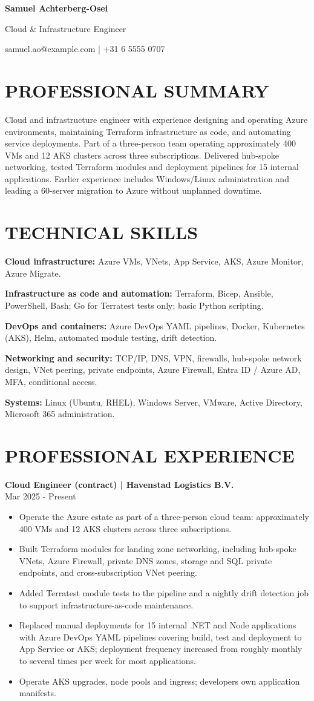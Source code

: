 \documentclass[11pt,a4paper]{article}
\newcommand{\cvsection}[1]{\section*{#1}}
\newcommand{\cvrole}[2]{\par\addvspace{0.5em}\noindent\textbf{#1}\\#2\par}
\begin{document}
{\Huge\bfseries\color{primarycolor} Samuel Achterberg-Osei}\par
{\large\color{accentcolor} Cloud \& Infrastructure Engineer}\par
samuel.ao@example.com | +31 6 5555 0707

\cvsection{PROFESSIONAL SUMMARY}
Cloud and infrastructure engineer with experience designing and operating Azure environments, maintaining Terraform infrastructure as code, and automating service deployments. Part of a three-person team operating approximately 400 VMs and 12 AKS clusters across three subscriptions. Delivered hub-spoke networking, tested Terraform modules and deployment pipelines for 15 internal applications. Earlier experience includes Windows/Linux administration and leading a 60-server migration to Azure without unplanned downtime.

\cvsection{TECHNICAL SKILLS}
\textbf{Cloud infrastructure:} Azure VMs, VNets, App Service, AKS, Azure Monitor, Azure Migrate.\par
\textbf{Infrastructure as code and automation:} Terraform, Bicep, Ansible, PowerShell, Bash; Go for Terratest tests only; basic Python scripting.\par
\textbf{DevOps and containers:} Azure DevOps YAML pipelines, Docker, Kubernetes (AKS), Helm, automated module testing, drift detection.\par
\textbf{Networking and security:} TCP/IP, DNS, VPN, firewalls, hub-spoke network design, VNet peering, private endpoints, Azure Firewall, Entra ID / Azure AD, MFA, conditional access.\par
\textbf{Systems:} Linux (Ubuntu, RHEL), Windows Server, VMware, Active Directory, Microsoft 365 administration.

\cvsection{PROFESSIONAL EXPERIENCE}
\cvrole{Cloud Engineer (contract) | Havenstad Logistics B.V.}{Mar 2025 - Present}
\begin{itemize}
\item Operate the Azure estate as part of a three-person cloud team: approximately 400 VMs and 12 AKS clusters across three subscriptions.
\item Built Terraform modules for landing zone networking, including hub-spoke VNets, Azure Firewall, private DNS zones, storage and SQL private endpoints, and cross-subscription VNet peering.
\item Added Terratest module tests to the pipeline and a nightly drift detection job to support infrastructure-as-code maintenance.
\item Replaced manual deployments for 15 internal .NET and Node applications with Azure DevOps YAML pipelines covering build, test and deployment to App Service or AKS; deployment frequency increased from roughly monthly to several times per week for most applications.
\item Operate AKS upgrades, node pools and ingress; developers own application manifests.
\end{itemize}
\end{document}
